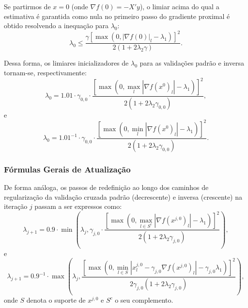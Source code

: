 Se partirmos de $x = 0$ (onde $\nabla f(0) = -X'y$), o limiar acima do qual a estimativa é garantida como nula no primeiro passo do gradiente proximal é obtido resolvendo a inequação para $\lambda_0$:
\[
\lambda_0 \le \frac{\gamma \left[\max\left(0, |\nabla f(0)|_l - \lambda_1\right)\right]^2}{2 (1 + 2\lambda_2 \gamma)}.
\]

Dessa forma, os limiares inicializadores de $\lambda_0$ para as validações padrão e inversa tornam-se, respectivamente:
\[
\lambda_0 = 1.01 \cdot \gamma_{0,0} \cdot \frac{\left[\max\left(0, \max_l |\nabla f(x^0)_l| - \lambda_1\right)\right]^2}{2 (1 + 2\lambda_2 \gamma_{0,0})},
\]
e
\[
\lambda_0 = 1.01^{-1} \cdot \gamma_{0,0} \cdot \frac{\left[\max\left(0, \min_l |\nabla f(x^0)_l| - \lambda_1\right)\right]^2}{2 (1 + 2\lambda_2 \gamma_{0,0})}.
\]

\subsubsection{Fórmulas Gerais de Atualização}

De forma análoga, os passos de redefinição ao longo dos caminhos de regularização da validação cruzada padrão (decrescente) e inversa (crescente) na iteração $j$ passam a ser expressos como:
\[
\lambda_{j+1} = 0.9 \cdot \min\left(\lambda_j, \gamma_{j,0} \cdot \frac{\left[\max\left(0, \max_{l \in S^c} |\nabla f(x^{j,0})_l| - \lambda_1\right)\right]^2}{2 (1 + 2\lambda_2 \gamma_{j,0})}\right),
\]
e
\[
\lambda_{j+1} = 0.9^{-1} \cdot \max\left(\lambda_j, \frac{\left[\max\left(0, \min_{l \in S} |x^{j,0}_l - \gamma_{j,0} \nabla f(x^{j,0})_l| - \gamma_{j,0} \lambda_1\right)\right]^2}{2\gamma_{j,0} (1 + 2\lambda_2 \gamma_{j,0})}\right),
\]
onde $S$ denota o suporte de $x^{j,0}$ e $S^c$ o seu complemento.


